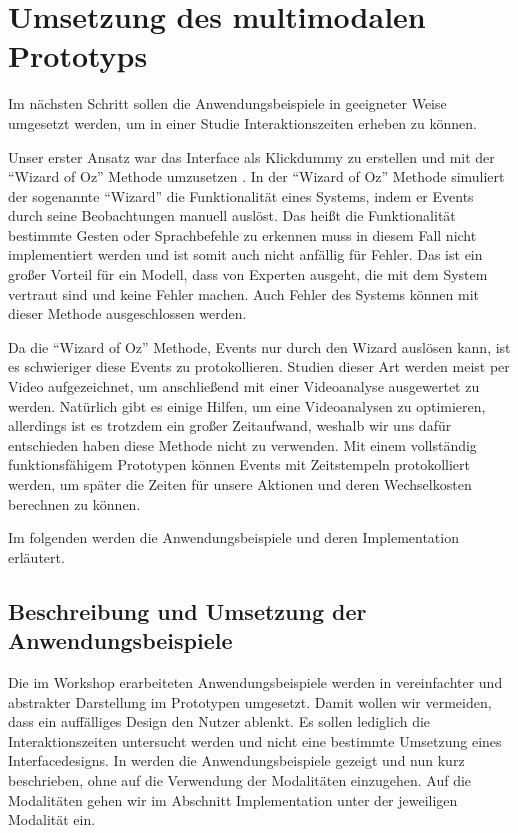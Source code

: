 \chapter[Multimodaler Prototyp]{Umsetzung des multimodalen Prototyps}\label{cha:Prototyp}
Im nächsten Schritt sollen die Anwendungsbeispiele in geeigneter Weise umgesetzt werden, um in einer Studie Interaktionszeiten erheben zu können. 

Unser erster Ansatz war das Interface als Klickdummy zu erstellen und mit der "`Wizard of Oz"' Methode umzusetzen \citep{salber1993applying}. 
In der "`Wizard of Oz"' Methode simuliert der sogenannte "`Wizard"' die Funktionalität eines Systems, indem er Events durch seine Beobachtungen manuell auslöst. 
Das heißt die Funktionalität bestimmte Gesten oder Sprachbefehle zu erkennen muss in diesem Fall nicht implementiert werden und ist somit auch nicht anfällig für Fehler. 
Das ist ein großer Vorteil für ein Modell, dass von Experten ausgeht, die mit dem System vertraut sind und keine Fehler machen. 
Auch Fehler des Systems können mit dieser Methode ausgeschlossen werden. 

Da die "`Wizard of Oz"' Methode, Events nur durch den Wizard auslösen kann, ist es schwieriger diese Events zu protokollieren. 
Studien dieser Art werden meist per Video aufgezeichnet, um anschließend mit einer Videoanalyse ausgewertet zu werden. 
Natürlich gibt es einige Hilfen, um eine Videoanalysen zu optimieren, allerdings ist es trotzdem ein großer Zeitaufwand, weshalb wir uns dafür entschieden haben diese Methode nicht zu verwenden. 
Mit einem vollständig funktionsfähigem Prototypen können Events mit Zeitstempeln protokolliert werden, um später die Zeiten für unsere Aktionen und deren Wechselkosten berechnen zu können. 

Im folgenden werden die Anwendungsbeispiele und deren Implementation erläutert.

\section[Anwendungsbeispiele]{Beschreibung und Umsetzung der Anwendungsbeispiele}
Die im Workshop erarbeiteten Anwendungsbeispiele werden in vereinfachter und abstrakter Darstellung im Prototypen umgesetzt. 
Damit wollen wir vermeiden, dass ein auffälliges Design den Nutzer ablenkt. 
Es sollen lediglich die Interaktionszeiten untersucht werden und nicht eine bestimmte Umsetzung eines Interfacedesigns. 
In  werden die Anwendungsbeispiele gezeigt und nun kurz beschrieben, ohne auf die Verwendung der Modalitäten einzugehen. 
Auf die Modalitäten gehen wir im Abschnitt Implementation unter der jeweiligen Modalität ein. 

